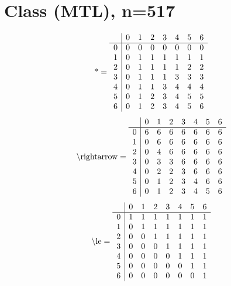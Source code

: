 \documentclass[11pt]{article}
\begin{document}
\section{Class (MTL), n=517}
\[\text{*} = 
\begin{array}{r | r r r r r r r}
 & 0 & 1 & 2 & 3 & 4 & 5 & 6 \\ \hline
0 & 0 & 0 & 0 & 0 & 0 & 0 & 0 \\
1 & 0 & 1 & 1 & 1 & 1 & 1 & 1 \\
2 & 0 & 1 & 1 & 1 & 1 & 2 & 2 \\
3 & 0 & 1 & 1 & 1 & 3 & 3 & 3 \\
4 & 0 & 1 & 1 & 3 & 4 & 4 & 4 \\
5 & 0 & 1 & 2 & 3 & 4 & 5 & 5 \\
6 & 0 & 1 & 2 & 3 & 4 & 5 & 6 \\
\end{array}
\]
\[\text{\textbackslash rightarrow} = 
\begin{array}{r | r r r r r r r}
 & 0 & 1 & 2 & 3 & 4 & 5 & 6 \\ \hline
0 & 6 & 6 & 6 & 6 & 6 & 6 & 6 \\
1 & 0 & 6 & 6 & 6 & 6 & 6 & 6 \\
2 & 0 & 4 & 6 & 6 & 6 & 6 & 6 \\
3 & 0 & 3 & 3 & 6 & 6 & 6 & 6 \\
4 & 0 & 2 & 2 & 3 & 6 & 6 & 6 \\
5 & 0 & 1 & 2 & 3 & 4 & 6 & 6 \\
6 & 0 & 1 & 2 & 3 & 4 & 5 & 6 \\
\end{array}
\]
\[\text{\textbackslash le} = 
\begin{array}{r | r r r r r r r}
 & 0 & 1 & 2 & 3 & 4 & 5 & 6 \\ \hline
0 & 1 & 1 & 1 & 1 & 1 & 1 & 1 \\
1 & 0 & 1 & 1 & 1 & 1 & 1 & 1 \\
2 & 0 & 0 & 1 & 1 & 1 & 1 & 1 \\
3 & 0 & 0 & 0 & 1 & 1 & 1 & 1 \\
4 & 0 & 0 & 0 & 0 & 1 & 1 & 1 \\
5 & 0 & 0 & 0 & 0 & 0 & 1 & 1 \\
6 & 0 & 0 & 0 & 0 & 0 & 0 & 1 \\
\end{array}
\]
\end{document}
